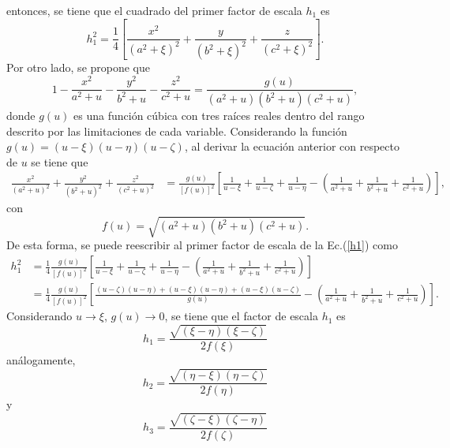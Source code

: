 \documentclass[paper=letter, fontsize=12pt,]{article}
\begin{document}
entonces, se tiene que el cuadrado del primer factor de escala $h_1$ es
\begin{equation}
    h_1^2=\frac{1}{4}\left[\frac{x^2}{(a^2+\xi)^2}+\frac{y}{(b^2+\xi)^2}+\frac{z}{(c^2+\xi)^2}\right].
    \label{h1}
\end{equation}
Por otro lado, se propone que
\begin{equation}
    1-\frac{x^2}{a^2+u}-\frac{y^2}{b^2+u}-\frac{z^2}{c^2+u}=\frac{g(u)}{(a^2+u)(b^2+u)(c^2+u)},
\end{equation}
donde $g(u)$ es una función cúbica con tres raíces reales dentro del rango descrito por las limitaciones de cada variable. Considerando la función $g(u)=(u-\xi)(u-\eta)(u-\zeta)$,  al derivar la ecuación anterior con respecto de $u$ se tiene que
\begin{align}
    \frac{x^2}{(a^2+u)^2}+\frac{y^2}{(b^2+u)^2}+\frac{z^2}{(c^2+u)^2}&=\frac{g(u)}{[f(u)]^2}\left[\frac{1}{u-\xi}+\frac{1}{u-\zeta}+\frac{1}{u-\eta}-\left(\frac{1}{a^2+u}+\frac{1}{b^2+u}+\frac{1}{c^2+u}\right)\right],
\end{align}
con 
\begin{equation}
    f(u)=\sqrt{(a^2+u)(b^2+u)(c^2+u)}.    
\end{equation}
De esta forma, se puede reescribir al primer factor de escala de la Ec.(\ref{h1}) como
\begin{align*}
h_1^2&=\frac{1}{4}\frac{g(u)}{[f(u)]^2}\left[\frac{1}{u-\xi}+\frac{1}{u-\zeta}+\frac{1}{u-\eta}-\left(\frac{1}{a^2+u}+\frac{1}{b^2+u}+\frac{1}{c^2+u}\right)\right]\nonumber\\
&=\frac{1}{4}\frac{g(u)}{[f(u)]^2}\left[\frac{(u-\zeta)(u-\eta)+(u-\xi)(u-\eta)+(u-\xi)(u-\zeta)}{g(u)}-\left(\frac{1}{a^2+u}+\frac{1}{b^2+u}+\frac{1}{c^2+u}\right)\right].    
\end{align*}
Considerando $u\rightarrow\xi$, $g(u)\rightarrow 0$, se tiene que el factor de escala $h_1$ es
\begin{equation}
    h_1=\frac{\sqrt{(\xi-\eta)(\xi-\zeta)}}{2f(\xi)}    
\end{equation}
análogamente, 
\begin{equation}
    h_2=\frac{\sqrt{(\eta-\xi)(\eta-\zeta)}}{2f(\eta)}
\end{equation}
y 
\begin{equation}
    h_3=\frac{\sqrt{(\zeta-\xi)(\zeta-\eta)}}{2f(\zeta)}
\end{equation}
\end{document}
